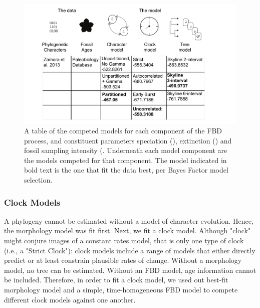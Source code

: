 \documentclass{article}
\begin{document}
\begin{figure}
  \includegraphics[width=\textwidth]{figures/Fig2.pdf}

  \caption{A table of the competed models for each component of the FBD process, and constituent parameters speciation (\textit{\textlambda}), extinction (\textit{\textmu}) and fossil sampling intensity (\textit{\textpsi}. Underneath each model component are the models competed for that component. The model indicated in bold text is the one that fit the data best, per Bayes Factor model selection.}
\end{figure}


\subsubsection{Clock Models}

A phylogeny cannot be estimated without a model of character evolution. %
Hence, the morphology model was fit first.
Next, we fit a clock model.
Although "clock" might conjure images of a constant rates model, that is only one type of clock (i.e., a "Strict Clock"): clock models include a range of models that either directly predict or at least constrain plausible rates of change. %
Without a morphology model, no tree can be estimated.
Without an FBD model, age information cannot be included.
Therefore, in order to fit a clock model, we used out best-fit morphology model and a simple, time-homogeneous FBD model to compete different clock models against one another.
\end{document}
